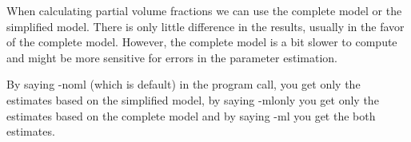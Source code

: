 \documentclass{article}
\begin{document}
When calculating partial
volume fractions we can use the complete model or the simplified
model. There is only little difference in the results, usually in the
favor of the complete model. However, the complete model is a bit 
slower to compute and might be more sensitive for errors in the parameter estimation. 

By saying -noml (which is default) in the program call, you get 
only the estimates based on the simplified model, by saying -mlonly  you get 
only the estimates based on the complete model and by saying -ml you
get the both estimates.
\end{document}
